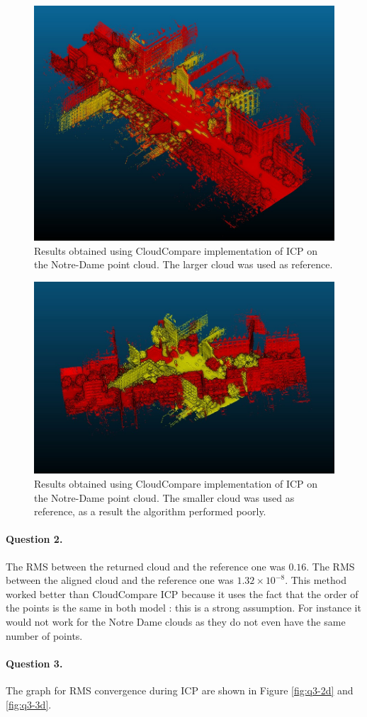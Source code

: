 \documentclass[french]{article}
\begin{document}
\begin{figure}[h]
	\centering
	\includegraphics[width=0.6\linewidth]{q1-nd-12.jpg}
	\caption{Results obtained using CloudCompare implementation of ICP on the Notre-Dame point cloud. The larger cloud was used as reference.}
	\label{fig:q1-nd12}
\end{figure}

\begin{figure}[h]
	\centering
	\includegraphics[width=0.6\linewidth]{q1-nd-21.jpg}
	\caption{Results obtained using CloudCompare implementation of ICP on the Notre-Dame point cloud. The smaller cloud was used as reference, as a result the algorithm performed poorly.}
	\label{fig:q1-nd21}
\end{figure}

\paragraph{Question 2.} The RMS between the returned cloud and the reference one was $0.16$. The RMS between the aligned cloud and the reference one was $1.32\times 10^{-8}$. This method worked better than CloudCompare ICP because it uses the fact that the order of the points is the same in both model : this is a strong assumption. For instance it would not work for the Notre Dame clouds as they do not even have the same number of points.

\paragraph{Question 3.}
The graph for RMS convergence during ICP are shown in Figure \ref{fig:q3-2d} and \ref{fig:q3-3d}.
\end{document}
